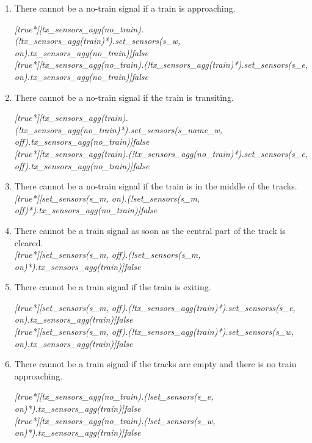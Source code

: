 \documentclass[final]{report}
\begin{document}
\begin{enumerate}
\item There cannot be a no-train signal if a train is approaching.

\textit{[true*][tx\_sensors\_agg(no\_train).(!tx\_sensors\_agg(train)*).set\_sensors(s\_w, on).tx\_sensors\_agg(no\_train)]false}\\
\textit{[true*][tx\_sensors\_agg(no\_train).(!tx\_sensors\_agg(train)*).set\_sensors(s\_e, on).tx\_sensors\_agg(no\_train)]false} 


\item There cannot be a no-train signal if the train is transiting.

\textit{[true*][tx\_sensors\_agg(train).(!tx\_sensors\_agg(no\_train)*).set\_sensors(s\_name\_w, off).tx\_sensors\_agg(no\_train)]false}\\
\textit{[true*][tx\_sensors\_agg(train).(!tx\_sensors\_agg(no\_train)*).set\_sensors(s\_e, off).tx\_sensors\_agg(no\_train)]false}


\item There cannot be a no-train signal if the train is in the middle of the tracks.\\
\textit{[true*][set\_sensors(s\_m, on).(!set\_sensors(s\_m, off)*).tx\_sensors\_agg(no\_train)]false}

\item There cannot be a train signal as soon as the central part of the track is cleared.\\
\textit{[true*][set\_sensors(s\_m, off).(!set\_sensors(s\_m, on)*).tx\_sensors\_agg(train)]false
}

\item There cannot be a train signal if the train is exiting.

\textit{[true*][set\_sensors(s\_m, off).(!tx\_sensors\_agg(train)*).set\_sensorss(s\_e, on).tx\_sensors\_agg(train)]false}\\
\textit{[true*][set\_sensors(s\_m, off).(!tx\_sensors\_agg(train)*).set\_sensors(s\_w, on).tx\_sensors\_agg(train)]false}


\item There cannot be a train signal if the tracks are empty and there is no train approaching.

\textit{[true*][tx\_sensors\_agg(no\_train).(!set\_sensors(s\_e, on)*).tx\_sensors\_agg(train)]false}\\
\textit{[true*][tx\_sensors\_agg(no\_train).(!set\_sensors(s\_w, on)*).tx\_sensors\_agg(train)]false}


\end{enumerate}
\end{document}
